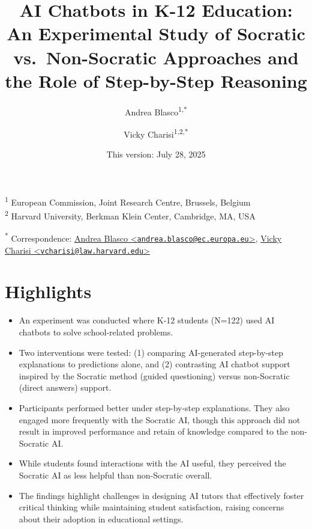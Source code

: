 \documentclass[
  11pt,
]{article}
\title{AI Chatbots in K-12 Education: An Experimental Study of Socratic vs.~Non-Socratic Approaches and the Role of Step-by-Step Reasoning}
\author{Andrea Blasco\textsuperscript{1,*} \and Vicky Charisi\textsuperscript{1,2,*}}
\date{This version: July 28, 2025}
\begin{document}
\maketitle

\textsuperscript{1} European Commission, Joint Research Centre, Brussels, Belgium\\
\textsuperscript{2} Harvard University, Berkman Klein Center, Cambridge, MA, USA

\textsuperscript{*} Correspondence: \href{mailto:andrea.blasco@ec.europa.eu}{Andrea Blasco \textless{}\href{mailto:andrea.blasco@ec.europa.eu}{\nolinkurl{andrea.blasco@ec.europa.eu}}\textgreater{}}, \href{mailto:vcharisi@law.harvard.edu}{Vicky Charisi \textless{}\href{mailto:vcharisi@law.harvard.edu}{\nolinkurl{vcharisi@law.harvard.edu}}\textgreater{}}

\section*{Highlights}\label{highlights}

\begin{itemize}
\item
  An experiment was conducted where K-12 students (N=122) used AI chatbots to solve school-related problems.
\item
  Two interventions were tested: (1) comparing AI-generated step-by-step explanations to predictions alone, and (2) contrasting AI chatbot support inspired by the Socratic method (guided questioning) versus non-Socratic (direct answers) support.
\end{itemize}

\begin{itemize}
\item
  Participants performed better under step-by-step explanations. They also engaged more frequently with the Socratic AI, though this approach did not result in improved performance and retain of knowledge compared to the non-Socratic AI.
\item
  While students found interactions with the AI useful, they perceived the Socratic AI as less helpful than non-Socratic overall.
\item
  The findings highlight challenges in designing AI tutors that effectively foster critical thinking while maintaining student satisfaction, raising concerns about their adoption in educational settings.
\end{itemize}
\end{document}
